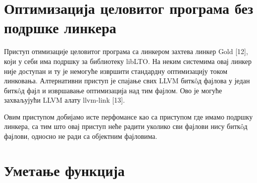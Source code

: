 \documentclass[12pt,oneside]{memoir}
\begin{document}
\section{Оптимизација целовитог програма без подршке линкера}

Приступ отимизације целовитог програма са линкером захтева линкер Gold [12],
који у себи има подршку за библиотеку libLTO.
На неким системима овај линкер није доступан и ту је немогуће извршити стандардну
оптимизацију током линковања.
Алтернативни приступ је спајање свих LLVM битк\^{o}д фајлова у један битк\^{o}д фајл
и извршавање оптимизација над тим фајлом.
Ово је могуће захваљујући LLVM алату llvm-link [13].

Овим приступом добијамо исте перфомансе као са приступом где имамо подршку линкера,
са тим што овај приступ неће радити уколико сви фајлови нису  битк\^{o}д фајлови,
односно не ради са објектним фајловима.


\section{Уметање функција}
\end{document}
